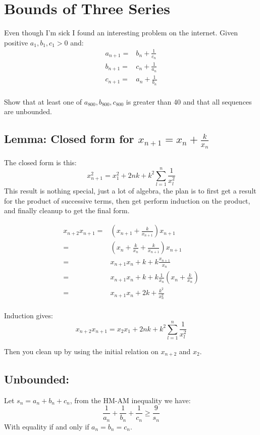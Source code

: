 
\section{Bounds of Three Series}
Even though I'm sick I found an interesting problem on the internet.
Given positive $a_1,b_1,c_1>0$ and:
\begin{equation*}
\begin{aligned}
	a_{n+1} =& b_n+\frac{1}{c_n}\\
	b_{n+1} =& c_n+\frac{1}{a_n}\\
	c_{n+1} =& a_n+\frac{1}{b_n}\\
\end{aligned}
\end{equation*}

Show that at least one of $a_{800},b_{800},c_{800}$ is greater than 40 and that all sequences are unbounded.

\subsection{Lemma: Closed form for $x_{n+1} = x_n+\frac{k}{x_n}$} 
The closed form is this:
\[ x_{n+1}^2 = x_1^2+2nk+k^2\sum_{l=1}^n\frac{1}{x_l^2}\]
This result is nothing special, 
just a lot of algebra,
the plan is to first get a result for the product of successive terms,
then get perform induction on the product,
and finally cleanup to get the final form.

\begin{equation*}
\begin{aligned}
	x_{n+2}x_{n+1} =& \left(x_{n+1}+\frac{k}{x_{n+1}}\right)x_{n+1}\\
	=& \left(x_n+\frac{k}{x_n}+\frac{k}{x_{n+1}}\right)x_{n+1}\\
	=& x_{n+1}x_n + k +k\frac{x_{n+1}}{x_n} \\
	=& x_{n+1}x_n + k +k\frac{1}{x_n}\left(x_n+\frac{k}{x_n}\right) \\
	=& x_{n+1}x_n + 2k +\frac{k^2}{x_n^2} \\
\end{aligned}
\end{equation*}

Induction gives:
\[ x_{n+2}x_{n+1} = x_2x_1+2nk+k^2\sum_{l=1}^n\frac{1}{x_l^2}\]

Then you clean up by using the initial relation on $x_{n+2}$ and $x_2$.

\subsection{Unbounded:}
Let $s_n = a_n+b_n+c_n$, 
from the HM-AM inequality we have:
\[\frac{1}{a_n}+\frac{1}{b_n}+\frac{1}{c_n} \geq \frac{9}{s_n}\]
With equality if and only if $a_n=b_n=c_n$.
\\

